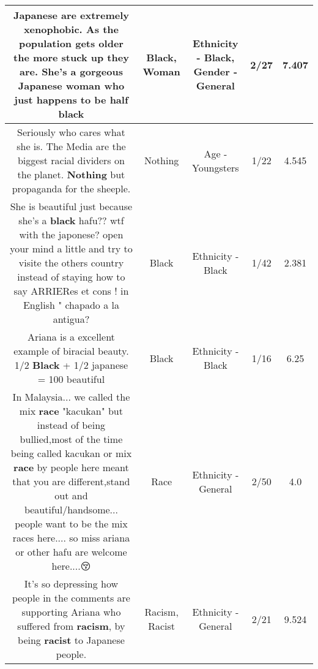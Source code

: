 \documentclass[11pt]{article}
\newlength\mylength
\begin{document}
\begin{center}
\begin{longtable}{|C{.65\mylength}|C{.30\mylength}|C{.12\mylength}|C{.12\mylength}|C{.12\mylength}|}
  \small Japanese are extremely xenophobic. As the population gets older the more stuck up they are. She's a gorgeous Japanese \textbf{woman} who just happens to be half black\normalsize   & Black, Woman & Ethnicity - Black, Gender - General & 2/27 & 7.407 \\  \hline
  \small Seriously who cares what she is. The Media are the biggest racial dividers on the planet.  \textbf{Nothing} but propaganda for the sheeple.\normalsize   & Nothing & Age - Youngsters & 1/22 & 4.545 \\  \hline
  \small She is beautiful just because she's a \textbf{black} hafu?? wtf with the japonese? open your mind a little  and try to visite the others country instead of staying how to say ARRIERes  et cons ! in English " chapado a la antigua?\normalsize   & Black & Ethnicity - Black & 1/42 & 2.381 \\  \hline
  \small Ariana is a excellent example of biracial beauty. 1/2 \textbf{Black} + 1/2 japanese = 100 beautiful\normalsize   & Black & Ethnicity - Black & 1/16 & 6.25 \\  \hline
  \small In Malaysia... we called the mix \textbf{race} "kacukan" but instead of being bullied,most of the time being called kacukan or mix \textbf{race} by people here meant that you are different,stand out and beautiful/handsome... people want to be the mix races here.... so miss ariana or other hafu are welcome here....😚\normalsize   & Race & Ethnicity - General & 2/50 & 4.0 \\  \hline
  \small It's so depressing how people in the comments are supporting Ariana who suffered from \textbf{racism}, by being \textbf{racist} to Japanese people.\normalsize   & Racism, Racist & Ethnicity - General & 2/21 & 9.524 \\  \hline

\end{longtable}
\end{center}
\end{document}
